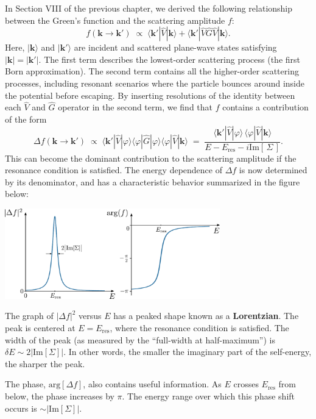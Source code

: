 \documentclass[pra,12pt]{revtex4}
\begin{document}
In Section VIII of the previous chapter, we derived the following
relationship between the Green's function and the scattering amplitude
$f$:
$$f(\mathbf{k}\rightarrow\mathbf{k}') \;\propto\; \langle \mathbf{k}'|\hat{V}|\mathbf{k}\rangle + \langle \mathbf{k}'|\hat{V}\hat{G}\hat{V}|\mathbf{k}\rangle.$$
Here, $|\mathbf{k}\rangle$ and $|\mathbf{k}'\rangle$ are incident and
scattered plane-wave states satisfying $|\mathbf{k}|=|\mathbf{k}'|$.
The first term describes the lowest-order scattering process (the
first Born approximation).  The second term contains all the
higher-order scattering processes, including resonant scenarios where
the particle bounces around inside the potential before escaping.
By inserting resolutions of the identity between each $\hat{V}$ and
$\hat{G}$ operator in the second term, we find that $f$ contains a
contribution of the form
$$\Delta f(\mathbf{k}\rightarrow\mathbf{k}') \;\propto\; \langle \mathbf{k}'|\hat{V}|\varphi\rangle\langle\varphi|\hat{G}|\varphi\rangle\langle\varphi|\hat{V}|\mathbf{k}\rangle \;=\; \frac{\langle \mathbf{k}'|\hat{V}|\varphi\rangle \, \langle\varphi|\hat{V}|\mathbf{k}\rangle}{\displaystyle E - E_{\mathrm{res}} - i \mathrm{Im}[\,\Sigma\,]}.$$
This can become the dominant contribution to the scattering amplitude
if the resonance condition is satisfied.  The energy dependence of
$\Delta f$ is now determined by its denominator, and has a
characteristic behavior summarized in the figure below:

\begin{center}
  \includegraphics[width=0.7\textwidth]{resonance}  
\end{center}

The graph of $|\Delta f|^2$ versus $E$ has a peaked shape known as a
\textbf{Lorentzian}.  The peak is centered at $E = E_{\mathrm{res}}$,
where the resonance condition is satisfied.  The width of the peak (as
measured by the ``full-width at half-maximum'') is $\delta E \sim
2|\mathrm{Im}[\Sigma]|$.  In other words, the smaller the imaginary
part of the self-energy, the sharper the peak.

The phase, $\mathrm{arg}[\Delta f]$, also contains useful information.
As $E$ crosses $E_{\mathrm{res}}$ from below, the phase increases by
$\pi$.  The energy range over which this phase shift occurs is $\sim
|\mathrm{Im}[\Sigma]|$.
\end{document}
